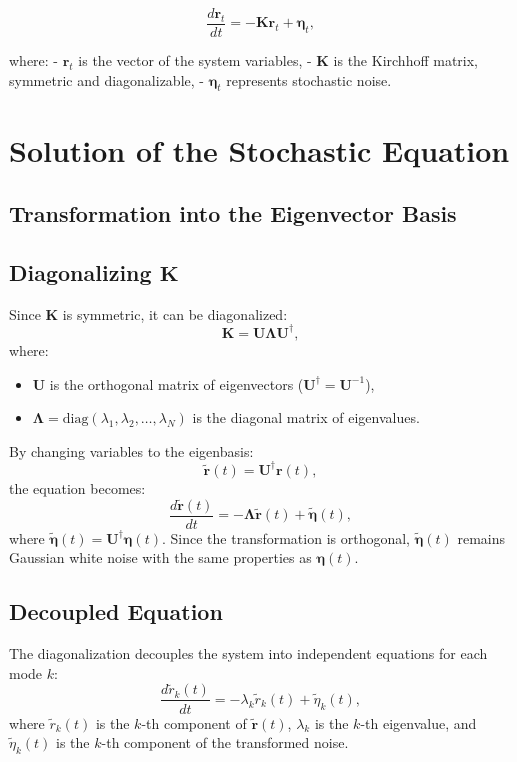\documentclass[English, Lau, oneside]{sapthesis}
\begin{document}
\begin{equation}
\frac{d \mathbf{r}_t}{dt} = -\mathbf{K} \mathbf{r}_t + \boldsymbol{\eta}_t,
\end{equation}

where:
- \( \mathbf{r}_t \) is the vector of the system variables,
- \( \mathbf{K} \) is the Kirchhoff matrix, symmetric and diagonalizable,
- \( \boldsymbol{\eta}_t \) represents stochastic noise.
\section{Solution of the Stochastic Equation}

\subsection*{Transformation into the Eigenvector Basis}
\subsection*{Diagonalizing \(\mathbf{K}\)}

Since \(\mathbf{K}\) is symmetric, it can be diagonalized:
\[
\mathbf{K} = \mathbf{U} \boldsymbol{\Lambda} \mathbf{U}^\dagger,
\]
where:
\begin{itemize}
    \item \(\mathbf{U}\) is the orthogonal matrix of eigenvectors (\(\mathbf{U}^\dagger = \mathbf{U}^{-1}\)),
    \item \(\boldsymbol{\Lambda} = \text{diag}(\lambda_1, \lambda_2, \dots, \lambda_N)\) is the diagonal matrix of eigenvalues.
\end{itemize}

By changing variables to the eigenbasis:
\[
\tilde{\mathbf{r}}(t) = \mathbf{U}^\dagger \mathbf{r}(t),
\]
the equation becomes:
\[
\frac{d \tilde{\mathbf{r}}(t)}{dt} = -\boldsymbol{\Lambda} \tilde{\mathbf{r}}(t) + \tilde{\boldsymbol{\eta}}(t),
\]
where \(\tilde{\boldsymbol{\eta}}(t) = \mathbf{U}^\dagger \boldsymbol{\eta}(t)\). Since the transformation is orthogonal, \(\tilde{\boldsymbol{\eta}}(t)\) remains Gaussian white noise with the same properties as \(\boldsymbol{\eta}(t)\).

\subsection*{Decoupled Equation}

The diagonalization decouples the system into independent equations for each mode \(k\):
\[
\frac{d \tilde{r}_k(t)}{dt} = -\lambda_k \tilde{r}_k(t) + \tilde{\eta}_k(t),
\]
where \(\tilde{r}_k(t)\) is the \(k\)-th component of \(\tilde{\mathbf{r}}(t)\), \(\lambda_k\) is the \(k\)-th eigenvalue, and \(\tilde{\eta}_k(t)\) is the \(k\)-th component of the transformed noise.
\end{document}
